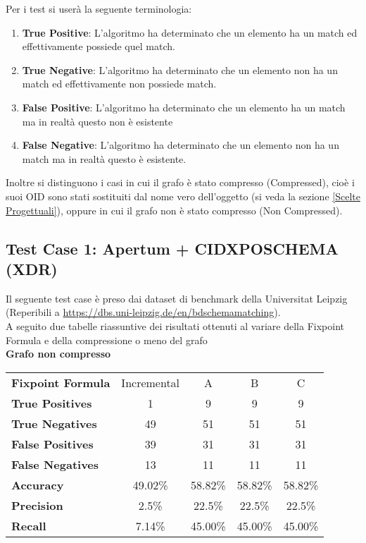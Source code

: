 \documentclass{article}
\begin{document}
Per i test si userà la seguente terminologia:
\begin{enumerate}
	\item \textbf{True Positive}: L'algoritmo ha determinato che un elemento ha un match ed effettivamente possiede quel match.
	\item \textbf{True Negative}: L'algoritmo ha determinato che un elemento non ha un match ed effettivamente non possiede match.
	\item \textbf{False Positive}: L'algoritmo ha determinato che un elemento ha un match ma in realtà questo non è esistente
	\item \textbf{False Negative}: L'algoritmo ha determinato che un elemento non ha un match ma in realtà questo è esistente.
\end{enumerate}

Inoltre si distinguono i casi in cui il grafo è stato compresso (Compressed), cioè i suoi OID sono stati sostituiti dal nome vero dell'oggetto (si veda la sezione \ref{Scelte Progettuali}), oppure in cui il grafo non è stato compresso (Non Compressed).

\subsection{Test Case 1: Apertum + CIDXPOSCHEMA (XDR)}

Il seguente test case è preso dai dataset di benchmark della Universitat Leipzig (Reperibili a \url{https://dbs.uni-leipzig.de/en/bdschemamatching}).\\

A seguito due tabelle riassuntive dei risultati ottenuti al variare della Fixpoint Formula e della compressione o meno del grafo\\

\textbf{Grafo non compresso}

\begin{center}
\begin{tabular}{| l | c | c | c | c |}
	\hline
	\textbf{Fixpoint Formula} & Incremental & A & B & C\\
	\hhline{|=|=|=|=|=|}
	\textbf{True Positives} & 1 & 9 & 9 & 9\\
	\hline
	\textbf{True Negatives} & 49 & 51 & 51 & 51\\
	\hline
	\textbf{False Positives} & 39 & 31 & 31 & 31\\
	\hline
	\textbf{False Negatives} & 13 & 11 & 11 & 11\\
	\hline
	\textbf{Accuracy} & 49.02\% & 58.82\% & 58.82\% & 58.82\%\\
	\hline
	\textbf{Precision} & 2.5\% & 22.5\% & 22.5\% & 22.5\%\\
	\hline
	\textbf{Recall} & 7.14\% & 45.00\% & 45.00\% & 45.00\%\\
	\hline
\end{tabular}
\end{center}
\vspace{4mm}
\end{document}
